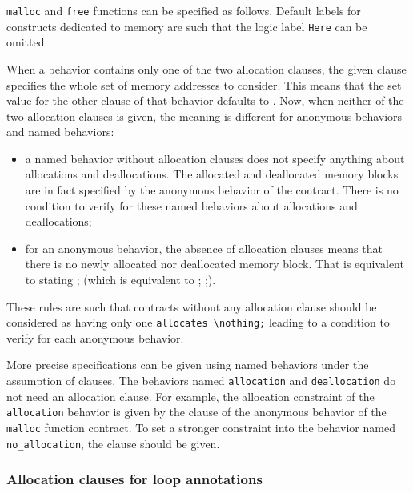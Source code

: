 \begin{example}
  \lstinline|malloc| and \lstinline|free| functions can be specified as follows.
  Default labels for constructs dedicated to memory are 
  such that the logic label \lstinline|Here| can be omitted.
\end{example}

When a behavior contains only one of the two allocation clauses,
the given clause specifies the whole set of memory addresses to consider.
This means that the set value for the other clause of that behavior defaults to \nothing.
Now, when neither of the two allocation clauses is given, the meaning is different
for anonymous behaviors and named behaviors:
\begin{itemize}
\item a named behavior without allocation clauses does not specify anything about
      allocations and deallocations. 
      The allocated and deallocated memory blocks are in fact specified by the 
      anonymous behavior of the contract.
      There is no condition to verify for these named behaviors about allocations 
      and deallocations;
\item for an anonymous behavior, the absence of allocation clauses means that there is no newly 
      allocated nor deallocated memory block. 
      That is equivalent to stating \allocates \nothing; (which is equivalent to  \allocates \nothing; \frees \nothing;).
\end{itemize}
These rules are such that contracts without any allocation clause
should be considered 
as having only one \lstinline|allocates \nothing;| 
leading to a condition to verify for 
each anonymous behavior.

\begin{example}
  More precise specifications can be given using named behaviors under the 
  assumption of \assumes clauses.
  The behaviors named \lstinline|allocation| and
  \lstinline|deallocation| do not 
  need an allocation clause.
  For example, the allocation constraint of the \lstinline|allocation| behavior 
  is given by the clause \allocates \result of the anonymous behavior of the  
  \lstinline|malloc| function contract. 
  To set a stronger constraint into the behavior named \lstinline|no_allocation|,
  the clause \allocates \nothing should be given.
\end{example}

\subsubsection{Allocation clauses for loop annotations}


